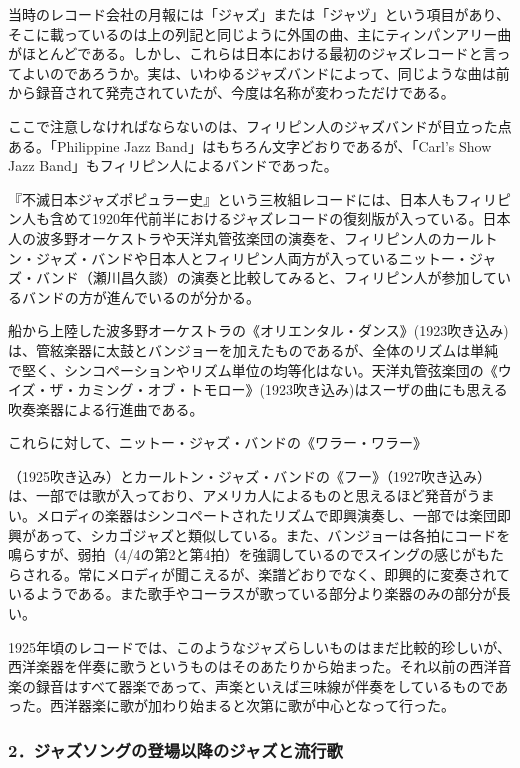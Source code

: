 当時のレコード会社の月報には「ジャズ」または「ジャヅ」という項目があり、そこに載っているのは上の列記と同じように外国の曲、主にティンパンアリー曲がほとんどである。しかし、これらは日本における最初のジャズレコードと言ってよいのであろうか。実は、いわゆるジャズバンドによって、同じような曲は前から録音されて発売されていたが、今度は名称が変わっただけである。

ここで注意しなければならないのは、フィリピン人のジャズバンドが目立った点ある。「Philippine Jazz Band」はもちろん文字どおりであるが、「Carl's Show Jazz Band」もフィリピン人によるバンドであった。

『不滅日本ジャズポピュラー史』という三枚組レコードには、日本人もフィリピン人も含めて1920年代前半におけるジャズレコードの復刻版が入っている。日本人の波多野オーケストラや天洋丸管弦楽団の演奏を、フィリピン人のカールトン・ジャズ・バンドや日本人とフィリピン人両方が入っているニットー・ジャズ・バンド（瀬川昌久談）の演奏と比較してみると、フィリピン人が参加しているバンドの方が進んでいるのが分かる。

船から上陸した波多野オーケストラの《オリエンタル・ダンス》(1923吹き込み)は、管絃楽器に太鼓とバンジョーを加えたものであるが、全体のリズムは単純で堅く、シンコペーションやリズム単位の均等化はない。天洋丸管弦楽団の《ウイズ・ザ・カミング・オブ・トモロー》(1923吹き込み)はスーザの曲にも思える吹奏楽器による行進曲である。

これらに対して、ニットー・ジャズ・バンドの《ワラー・ワラー》

\begin{gquote}
（1925吹き込み）とカールトン・ジャズ・バンドの《フー》（1927吹き込み）は、一部では歌が入っており、アメリカ人によるものと思えるほど発音がうまい。メロディの楽器はシンコペートされたリズムで即興演奏し、一部では楽団即興があって、シカゴジャズと類似している。また、バンジョーは各拍にコードを鳴らすが、弱拍（4/4の第2と第4拍）を強調しているのでスイングの感じがもたらされる。常にメロディが聞こえるが、楽譜どおりでなく、即興的に変奏されているようである。また歌手やコーラスが歌っている部分より楽器のみの部分が長い。
\end{gquote}

1925年頃のレコードでは、このようなジャズらしいものはまだ比較的珍しいが、西洋楽器を伴奏に歌うというものはそのあたりから始まった。それ以前の西洋音楽の録音はすべて器楽であって、声楽といえば三味線が伴奏をしているものであった。西洋器楽に歌が加わり始まると次第に歌が中心となって行った。

\subsubsection{2．ジャズソングの登場以降のジャズと流行歌}

